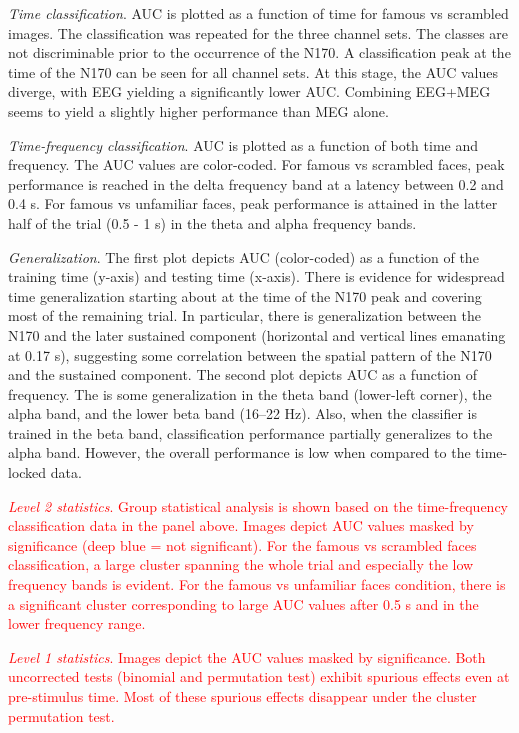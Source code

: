 \documentclass[utf8]{frontiersSCNS} %
\newcommand{\red}[1]{\textcolor{red}{#1}}
\begin{document}
\textit{Time classification}. AUC is plotted as a function of time for famous vs scrambled images. The classification was repeated for the three channel sets. The classes are not discriminable prior to the occurrence of the N170. A classification peak at the time of the N170 can be seen for all channel sets. At this stage, the AUC values diverge, with EEG yielding a significantly lower AUC. Combining EEG+MEG seems to yield a slightly higher performance than MEG alone.

\textit{Time-frequency classification}. AUC is plotted as a function of both time and frequency. The AUC values are color-coded. For famous vs scrambled faces, peak performance is reached in the delta frequency band at a latency between 0.2 and 0.4 s. For famous vs unfamiliar faces, peak performance is attained in the latter half of the trial (0.5 - 1 s) in the theta and alpha frequency bands. 

\textit{Generalization}. The first plot depicts AUC (color-coded) as a function of the training time (y-axis) and testing time (x-axis). There is evidence for widespread time generalization starting about at the time of the N170 peak and covering most of the remaining trial. In particular, there is generalization between the N170 and the later sustained component (horizontal and vertical lines emanating at 0.17 s), suggesting some correlation between the spatial pattern of the N170 and the sustained component. 
The second plot depicts AUC as a function of frequency. The is some generalization in the theta band (lower-left corner), the alpha band, and the lower beta band (16--22 Hz). Also, when the classifier is trained in the beta band, classification performance partially generalizes to the alpha band. However, the overall performance is low when compared to the time-locked data. 

\red{\textit{Level 2 statistics}. Group statistical analysis is shown based on the time-frequency classification data in the panel above. Images depict AUC values masked by significance (deep blue = not significant). For the famous vs scrambled faces classification, a large cluster spanning the whole trial and especially the low frequency bands is evident. For the famous vs unfamiliar faces condition, there is a significant  cluster corresponding to large AUC values after 0.5 s and in the lower frequency range.}

\red{\textit{Level 1 statistics}. Images depict the AUC values masked by significance. Both uncorrected tests (binomial and permutation test) exhibit spurious effects even at pre-stimulus time. Most of these spurious effects disappear under the cluster permutation test.}
\end{document}
